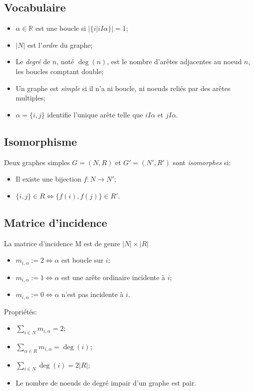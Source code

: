 \subsection{Vocabulaire}
\begin{itemize}
  \item $\alpha \in \mathbb{R}$ est une boucle si $|\{i|iI\alpha\}| = 1$;
  \item $|N|$ est l'\emph{ordre} du graphe;
  \item Le \emph{degré} de $n$, noté $\deg(n)$,
    est le nombre d'arêtes adjacentes au noeud $n$, les boucles comptant double;
  \item Un graphe est \emph{simple} si il n'a ni boucle,
    ni noeuds reliés par des arêtes multiples;
  \item $\alpha = \{i, j\}$ identifie l'unique arête
    telle que $iI\alpha$ et $jI\alpha$.
\end{itemize}

\subsection{Isomorphisme}
Deux graphes simples $G = (N,R)$ et $G' = (N',R')$ sont \emph{isomorphes} si:
\begin{itemize}
  \item Il existe une bijection $f : N \rightarrow N'$;
  \item $\{i,j\} \in R \Leftrightarrow \{f(i), f(j)\} \in R'$.
\end{itemize}

\subsection{Matrice d'incidence}
La matrice d'incidence M est de genre $|N|\times |R|$
\begin{itemize}
  \item $m_{i,\alpha} := 2 \Leftrightarrow \alpha$ est boucle sur $i$;
  \item $m_{i,\alpha} := 1 \Leftrightarrow \alpha$
    est une arête ordinaire incidente à $i$;
  \item $m_{i,\alpha} := 0 \Leftrightarrow \alpha$ n'est pas incidente à $i$.
\end{itemize}
Propriétés:
\begin{itemize}
  \item $\sum_{i \in N}m_{i,\alpha} = 2$;
  \item $\sum_{\alpha \in R}m_{i,\alpha} = \deg(i)$;
  \item $\sum_{i \in N}\deg(i) = 2|R|$;
  \item Le nombre de noeuds de degré impair d'un graphe est pair.
\end{itemize}

